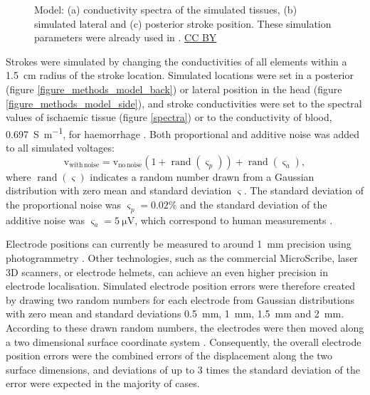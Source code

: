\begin{figure*}[t!]	
\centering
	\hfil
	\hfil
\caption{Model: (a) conductivity spectra of the simulated tissues, (b) simulated lateral and (c) posterior stroke position. These simulation parameters were already used in \citet{Malone2014}. \href{https://creativecommons.org/licenses/by/3.0/}{CC BY}}
\end{figure*}

Strokes were simulated by changing the conductivities of all elements within a \SI{1.5}{\centi\metre} radius of the stroke location. Simulated locations were set in a posterior (figure \ref{figure_methods_model_back}) or lateral position in the head (figure \ref{figure_methods_model_side}), and stroke conductivities were set to the spectral values of ischaemic tissue (figure \ref{spectra}) or to the conductivity of blood, \SI{0.697}{\siemens\per\metre}, for haemorrhage \citep{Horesh2006}. Both proportional and additive noise was added to all simulated voltages:
\begin{equation}{}
\mathrm{v}_{\mathrm{with\,noise}}=\mathrm{v}_{\mathrm{no\,noise}}\left(1+\operatorname{rand}(\varsigma_p)\right)+\operatorname{rand}(\varsigma_a),
\end{equation}
where $\operatorname{rand}(\varsigma)$ indicates a random number drawn from a Gaussian distribution with zero mean and standard deviation $\varsigma$. The standard deviation of the proportional noise was $\varsigma_p=0.02\%$ and the standard deviation of the additive noise was $\varsigma_a=\SI{5}{\micro\volt}$, which correspond to human measurements \citep{Goren2015}.

Electrode positions can currently be measured to around \SI{1}{\milli\metre} precision using photogrammetry \citep{Qian2011}. Other technologies, such as the commercial MicroScribe, laser 3D scanners, or electrode helmets, can achieve an even higher precision in electrode localisation. Simulated electrode position errors were therefore created by drawing two random numbers for each electrode from Gaussian distributions with zero mean and standard deviations \SI{0.5}{\milli\metre}, \SI{1}{\milli\metre}, \SI{1.5}{\milli\metre} and \SI{2}{\milli\metre}. According to these drawn random numbers, the electrodes were then moved along a two dimensional surface coordinate system \citep{Jehl2015b}. Consequently, the overall electrode position errors were the combined errors of the displacement along the two surface dimensions, and deviations of up to 3 times the standard deviation of the error were expected in the majority of cases.

